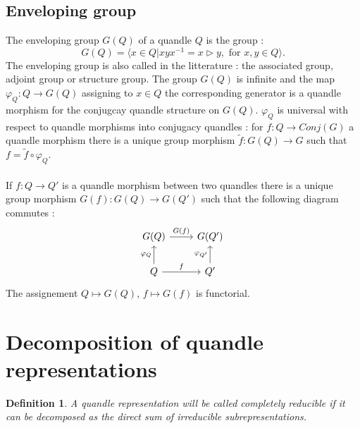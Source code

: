 \documentclass[12pt, reqno]{amsart}
\newtheorem{definition}[theorem]{Definition}
\begin{document}
\subsection{Enveloping group}
The enveloping group $G(Q)$ of a quandle $Q$ is the group :
$$G(Q)=\langle x \in Q \vert xyx^{-1}=x\triangleright y , \text{ for } x,y\in Q\rangle.$$
The enveloping group is also called in the litterature : the associated group, adjoint group or structure group. The group $G(Q)$ is infinite and the map $\varphi_Q : Q \to G(Q)$ assigning to $x\in Q$ the corresponding generator is a quandle morphism for the conjugcay quandle structure on $G(Q)$. $\varphi_Q$ is universal with respect to quandle morphisms into conjugacy quandles : for $f:Q\to Conj(G)$ a quandle morphism there is a unique group morphism $\tilde{f}:G(Q)\to G$ such that $f=\tilde{f}\circ\varphi_Q$. \\\\
If $f:Q\to Q'$ is a quandle morphism between two quandles there is a unique group morphism $G(f):G(Q)\to G(Q')$ such that the following diagram commutes :
$$\begin{tikzcd}
G(Q) \arrow{r}{G(f)} &G(Q')  \\ 
Q\arrow{u}{\varphi_Q} \arrow{r}{f} & Q'\arrow{u}{\varphi_{Q'}} 
\end{tikzcd} $$
The assignement $Q\mapsto G(Q)$, $f\mapsto G(f)$ is functorial.
 

\section{Decomposition of quandle representations}
\begin{definition}
A quandle representation will be called completely reducible if it can be decomposed as the direct sum of irreducible subrepresentations.
\end{definition}
\end{document}

